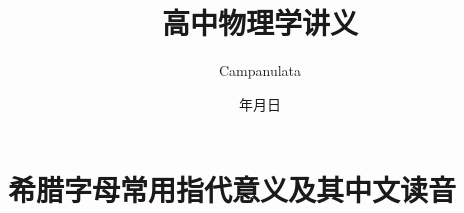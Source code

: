 \documentclass[cn,10.5pt,chinese,mac,chinesefont=founder]{elegantbook}
\title{高中物理学讲义}
\author{Campanulata}
\date{{\the\year}年{\the\month}月{\the\day}日}
\begin{document}
\maketitle
\frontmatter

\tableofcontents
\mainmatter















\nocite{*} 
\appendix

\chapter{希腊字母常用指代意义及其中文读音}
\end{document}
